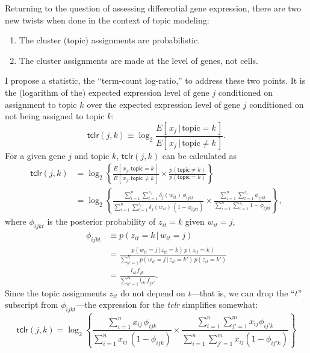 \documentclass[final]{siamart171218}
\begin{document}
Returning to the question of assessing differential gene expression,
there are two new twists when done in the context of topic modeling:
\begin{enumerate}
  
\item The cluster (topic) assignments are probabilistic.

\item The cluster assignments are made at the level of genes, not
  cells.

\end{enumerate}
I propose a statistic, the ``term-count log-ratio,'' to address these
two points. It is the (logarithm of the) expected expression level of
gene $j$ conditioned on assignment to topic $k$ over the expected
expression level of gene $j$ conditioned on not being assigned to
topic $k$:
\begin{equation}
\mathsf{tclr}(j,k) \equiv
\log_2 \frac{E[\,x_j \,|\, \mathrm{topic} = k\,]}
            {E[\,x_j \,|\, \mathrm{topic} \neq k\,]}.
\end{equation}
For a given gene $j$ and topic $k$, $\mathsf{tclr}(j,k)$ can be
calculated as
\begin{align}
\mathsf{tclr}(j,k) &=
\log_2 \left\{ \frac{E[\, x_j, \mathsf{topic} = k \,]}
                    {E[\, x_j, \mathsf{topic} \neq k\,]} \times
               \frac{p(\mathsf{topic} \neq k)}
                    {p(\mathsf{topic} = k)} \right\} \nonumber \\
&= \log_2 \left\{ 
\frac{\sum_{i=1}^n \sum_{t=1}^{s_i} \delta_j(w_{it}) \, \phi_{ijkt}}
     {\sum_{i=1}^n \sum_{t=1}^{s_i} \delta_j(w_{it}) \, (1 - \phi_{ijkt})}
     \times \frac{\sum_{i=1}^n \sum_{t=1}^{s_i} \phi_{ijkt}}
                 {\sum_{i=1}^n \sum_{t=1}^{s_i} 1-\phi_{ijkt}} 
\right\},
\label{eq:tclr}
\end{align}
where $\phi_{ijkt}$ is the posterior probability of $z_{it} = k$ given
$w_{it} = j$,
\begin{align}
\phi_{ijkt} &\equiv p(z_{it} = k \,|\, w_{it} = j) \nonumber \\
&= \frac{p(w_{it} = j \,|\, z_{it} = k) \, p(z_{it} = k)}
        {\sum_{k'=1}^K p(w_{it} = j \,|\, z_{it} = k') \, p(z_{it} = k')} 
   \nonumber \\
&= \frac{l_{ik} f_{jk}}
        {\sum_{k'=1}^K l_{ik'} f_{jk'}}.
\end{align}
Since the topic assignments $z_{it}$ do not depend on $t$---that is,
we can drop the ``$t$'' subscript from $\phi_{ijkt}$---the expression
for the {\em tclr} simplifies somewhat:
\begin{equation}
\mathsf{tclr}(j,k) = \log_2 \left\{ 
\frac{\sum_{i=1}^n x_{ij} \, \phi_{ijk}}
     {\sum_{i=1}^n x_{ij} \, (1 - \phi_{ijk})}
     \times \frac{\sum_{i=1}^n \sum_{j'=1}^m x_{ij} \phi_{ij'k}}
                 {\sum_{i=1}^n \sum_{j'=1}^m x_{ij} (1-\phi_{ij'k})} \right\}
\end{equation}
\end{document}
